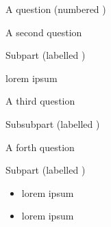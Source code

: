 \documentclass{../../exam2e}
\begin{document}
\gradetable[h][questions]

\begin{questions}
	\question[4] A question (numbered \thequestion)

\question A second question
\begin{subparts}
	\subpart Subpart (labelled \thesubpart)
	\begin{subsubparts}
		\subsubpart lorem ipsum
	\end{subsubparts}
\end{subparts}

\clearpage

\question A third question
\begin{subsubparts}
	\subsubpart Subsubpart (labelled \thesubsubpart)
\end{subsubparts}

\question A forth question
\begin{subparts}
	\subpart[4] Subpart (labelled \thesubpart)
	\begin{itemize}
		\item lorem ipsum
		\item lorem ipsum
	\end{itemize}
\end{subparts}


\end{questions}

\clearpage
\addtocounter{page}{-1}
\thispagestyle{empty} 



\end{document}
